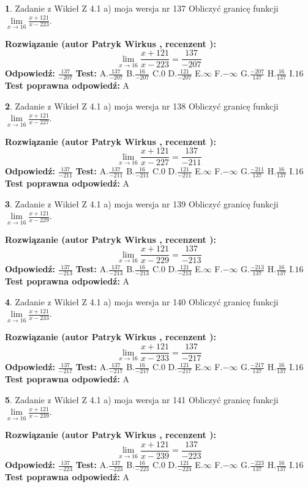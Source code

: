 \documentclass[12pt, a4paper]{article}
\theoremstyle{definition} %
\newtheorem{zad}{}
\newcommand{\zadStart}[1]{\begin{zad}#1\newline}
\newcommand{\zadStop}{\end{zad}}
\newcommand{\rozwStart}[2]{\noindent \textbf{Rozwiązanie (autor #1 , recenzent #2): }\newline}
\newcommand{\rozwStop}{\newline}
\newcommand{\odpStart}{\noindent \textbf{Odpowiedź:}\newline}
\newcommand{\odpStop}{\newline}
\newcommand{\testStart}{\noindent \textbf{Test:}\newline}
\newcommand{\testStop}{\newline}
\newcommand{\kluczStart}{\noindent \textbf{Test poprawna odpowiedź:}\newline}
\newcommand{\kluczStop}{\newline}
\begin{document}
\zadStart{Zadanie z Wikieł Z 4.1 a) moja wersja nr 137}
Obliczyć granicę funkcji $\lim\limits_{x\to16}\frac{x+121}{x-223}$.
\zadStop
\rozwStart{Patryk Wirkus}{}
$$\lim\limits_{x\to16}\frac{x+121}{x-223} = \frac{137}{-207}$$
\rozwStop
\odpStart
$\frac{137}{-207}$
\odpStop
\testStart
A.$\frac{137}{-207}$
B.$\frac{16}{-207}$
C.$0$
D.$\frac{121}{-207}$
E.$\infty$
F.$-\infty$
G.$\frac{-207}{137}$
H.$\frac{16}{137}$
I.$16$
\testStop
\kluczStart
A
\kluczStop



\zadStart{Zadanie z Wikieł Z 4.1 a) moja wersja nr 138}
Obliczyć granicę funkcji $\lim\limits_{x\to16}\frac{x+121}{x-227}$.
\zadStop
\rozwStart{Patryk Wirkus}{}
$$\lim\limits_{x\to16}\frac{x+121}{x-227} = \frac{137}{-211}$$
\rozwStop
\odpStart
$\frac{137}{-211}$
\odpStop
\testStart
A.$\frac{137}{-211}$
B.$\frac{16}{-211}$
C.$0$
D.$\frac{121}{-211}$
E.$\infty$
F.$-\infty$
G.$\frac{-211}{137}$
H.$\frac{16}{137}$
I.$16$
\testStop
\kluczStart
A
\kluczStop



\zadStart{Zadanie z Wikieł Z 4.1 a) moja wersja nr 139}
Obliczyć granicę funkcji $\lim\limits_{x\to16}\frac{x+121}{x-229}$.
\zadStop
\rozwStart{Patryk Wirkus}{}
$$\lim\limits_{x\to16}\frac{x+121}{x-229} = \frac{137}{-213}$$
\rozwStop
\odpStart
$\frac{137}{-213}$
\odpStop
\testStart
A.$\frac{137}{-213}$
B.$\frac{16}{-213}$
C.$0$
D.$\frac{121}{-213}$
E.$\infty$
F.$-\infty$
G.$\frac{-213}{137}$
H.$\frac{16}{137}$
I.$16$
\testStop
\kluczStart
A
\kluczStop



\zadStart{Zadanie z Wikieł Z 4.1 a) moja wersja nr 140}
Obliczyć granicę funkcji $\lim\limits_{x\to16}\frac{x+121}{x-233}$.
\zadStop
\rozwStart{Patryk Wirkus}{}
$$\lim\limits_{x\to16}\frac{x+121}{x-233} = \frac{137}{-217}$$
\rozwStop
\odpStart
$\frac{137}{-217}$
\odpStop
\testStart
A.$\frac{137}{-217}$
B.$\frac{16}{-217}$
C.$0$
D.$\frac{121}{-217}$
E.$\infty$
F.$-\infty$
G.$\frac{-217}{137}$
H.$\frac{16}{137}$
I.$16$
\testStop
\kluczStart
A
\kluczStop



\zadStart{Zadanie z Wikieł Z 4.1 a) moja wersja nr 141}
Obliczyć granicę funkcji $\lim\limits_{x\to16}\frac{x+121}{x-239}$.
\zadStop
\rozwStart{Patryk Wirkus}{}
$$\lim\limits_{x\to16}\frac{x+121}{x-239} = \frac{137}{-223}$$
\rozwStop
\odpStart
$\frac{137}{-223}$
\odpStop
\testStart
A.$\frac{137}{-223}$
B.$\frac{16}{-223}$
C.$0$
D.$\frac{121}{-223}$
E.$\infty$
F.$-\infty$
G.$\frac{-223}{137}$
H.$\frac{16}{137}$
I.$16$
\testStop
\kluczStart
A
\kluczStop
\end{document}
